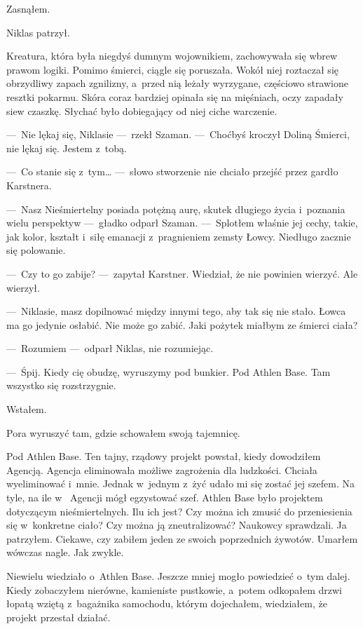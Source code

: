 Zasnąłem.

\paraSep

Niklas patrzył.

Kreatura, która była niegdyś dumnym wojownikiem, zachowywała się wbrew prawom logiki. Pomimo śmierci, ciągle się 
poruszała. Wokół niej roztaczał się obrzydliwy zapach zgnilizny, a~przed nią leżały wyrzygane, częściowo strawione 
resztki pokarmu. Skóra coraz bardziej opinała się na mięśniach, oczy zapadały siew czaszkę. Słychać było dobiegający 
od niej ciche warczenie. 

---~Nie lękaj się, Niklasie ---~rzekł Szaman. ---~Choćbyś kroczył Doliną Śmierci, nie lękaj się. Jestem z~tobą.

---~Co stanie się z~tym… ---~słowo stworzenie nie chciało przejść przez gardło Karstnera.

---~Nasz Nieśmiertelny posiada potężną aurę, skutek długiego życia i~poznania wielu perspektyw ---~gładko odparł 
Szaman. ---~Splotłem właśnie jej cechy, takie, jak kolor, kształt i~siłę emanacji z~pragnieniem zemsty Łowcy. 
Niedługo zacznie się polowanie.

---~Czy to go zabije? ---~zapytał Karstner. Wiedział, że nie powinien wierzyć. Ale wierzył.

---~Niklasie, masz dopilnować między innymi tego, aby tak się nie stało. Łowca ma go jedynie osłabić. Nie może go 
zabić. Jaki pożytek miałbym ze śmierci ciała?

---~Rozumiem ---~odparł Niklas, nie rozumiejąc.

---~Śpij. Kiedy cię obudzę, wyruszymy pod bunkier. Pod Athlen Base. Tam wszystko się rozstrzygnie.

\paraSep

Wstałem.

Pora wyruszyć tam, gdzie schowałem swoją tajemnicę.

Pod Athlen Base. Ten tajny, rządowy projekt powstał, kiedy dowodziłem Agencją. Agencja eliminowała możliwe zagrożenia 
dla ludzkości. Chciała wyeliminować i~mnie. Jednak w~jednym z~żyć udało mi się zostać jej szefem. Na tyle, na ile w~
Agencji mógł egzystować szef. Athlen Base było projektem dotyczącym nieśmiertelnych. Ilu ich jest? Czy można ich 
zmusić do przeniesienia się w~konkretne ciało? Czy można ją zneutralizować? Naukowcy sprawdzali. Ja patrzyłem.
Ciekawe, czy zabiłem jeden ze swoich poprzednich żywotów. Umarłem wówczas nagle. Jak zwykle.

Niewielu wiedziało o~Athlen Base. Jeszcze mniej mogło powiedzieć o~tym dalej. Kiedy zobaczyłem nierówne, kamieniste 
pustkowie, a~potem odkopałem drzwi łopatą wziętą z~bagażnika samochodu, którym dojechałem, wiedziałem, że projekt 
przestał działać.

